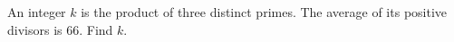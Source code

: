An integer $ k $ is the product of three distinct primes. The average of its positive divisors is 66. Find $ k $.
